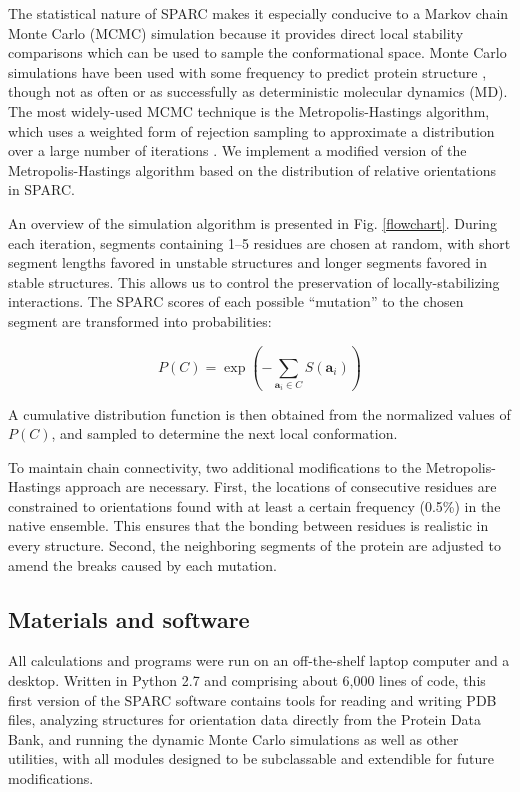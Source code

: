\documentclass[11pt]{article}
\begin{document}
The statistical nature of SPARC makes it especially conducive to a Markov chain Monte Carlo (MCMC) simulation because it provides direct local stability comparisons which can be used to sample the conformational space.
Monte Carlo simulations have been used with some frequency to predict protein structure \cite{kolinski,enciso}, though not as often or as successfully as deterministic molecular dynamics (MD).
The most widely-used MCMC technique is the Metropolis-Hastings algorithm, which uses a weighted form of rejection sampling to approximate a distribution over a large number of iterations \cite{metropolis}.
We implement a modified version of the Metropolis-Hastings algorithm based on the distribution of relative orientations in SPARC.

An overview of the simulation algorithm is presented in Fig. \ref{flowchart}.
During each iteration, segments containing 1--5 residues are chosen at random, with short segment lengths favored in unstable structures and longer segments favored in stable structures.
This allows us to control the preservation of locally-stabilizing interactions.
The SPARC scores of each possible ``mutation'' to the chosen segment are transformed into probabilities:

\begin{equation}
P(C) = \exp{\left(-\sum_{\textbf{a}_i\in C}S(\textbf{a}_i)\right)}
\label{probability_eq}
\end{equation}

A cumulative distribution function is then obtained from the normalized values of $P(C)$, and sampled to determine the next local conformation.

To maintain chain connectivity, two additional modifications to the Metropolis-Hastings approach are necessary. 
First, the locations of consecutive residues are constrained to orientations found with at least a certain frequency (0.5\%) in the native ensemble.
This ensures that the bonding between residues is realistic in every structure.
Second, the neighboring segments of the protein are adjusted to amend the breaks caused by each mutation.

\subsection{Materials and software}
\label{materials}
All calculations and programs were run on an off-the-shelf laptop computer and a desktop.
Written in Python 2.7 and comprising about 6,000 lines of code, this first version of the SPARC software contains tools for reading and writing PDB files, analyzing structures for orientation data directly from the Protein Data Bank, and running the dynamic Monte Carlo simulations as well as other utilities, with all modules designed to be subclassable and extendible for future modifications.
\end{document}
